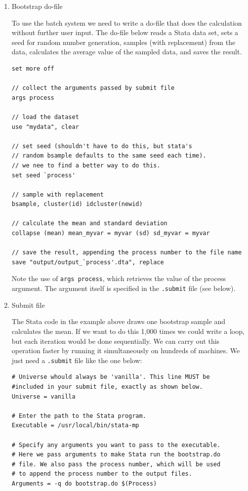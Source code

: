 \documentclass[]{book}
\begin{document}
\begin{enumerate}
\def\labelenumi{\arabic{enumi}.}
\item
  Bootstrap do-file

  To use the batch system we need to write a do-file that does the
  calculation without further user input. The do-file below reads a
  Stata data set, sets a seed for random number generation, samples
  (with replacement) from the data, calculates the average value of the
  sampled data, and saves the result.

\begin{verbatim}
set more off

// collect the arguments passed by submit file
args process

// load the dataset
use "mydata", clear

// set seed (shouldn't have to do this, but stata's
// random bsample defaults to the same seed each time).
// we nee to find a better way to do this.
set seed `process'

// sample with replacement
bsample, cluster(id) idcluster(newid)

// calculate the mean and standard deviation
collapse (mean) mean_myvar = myvar (sd) sd_myvar = myvar

// save the result, appending the process number to the file name
save "output/output_`process'.dta", replace
\end{verbatim}

  Note the use of \texttt{args\ process}, which retrieves the value of
  the process argument. The argument itself is specified in the
  \texttt{.submit} file (see below).
\item
  Submit file

  The Stata code in the example above draws one bootstrap sample and
  calculates the mean. If we want to do this 1,000 times we could write
  a loop, but each iteration would be done sequentially. We can carry
  out this operation faster by running it simultaneously on hundreds of
  machines. We just need a \texttt{.submit} file like the one below:

\begin{verbatim}
# Universe whould always be 'vanilla'. This line MUST be
#included in your submit file, exactly as shown below.
Universe = vanilla

# Enter the path to the Stata program.
Executable = /usr/local/bin/stata-mp

# Specify any arguments you want to pass to the executable.
# Here we pass arguments to make Stata run the bootstrap.do
# file. We also pass the process number, which will be used
# to append the process number to the output files.
Arguments = -q do bootstrap.do $(Process)


\end{verbatim}
\end{enumerate}
\end{document}
